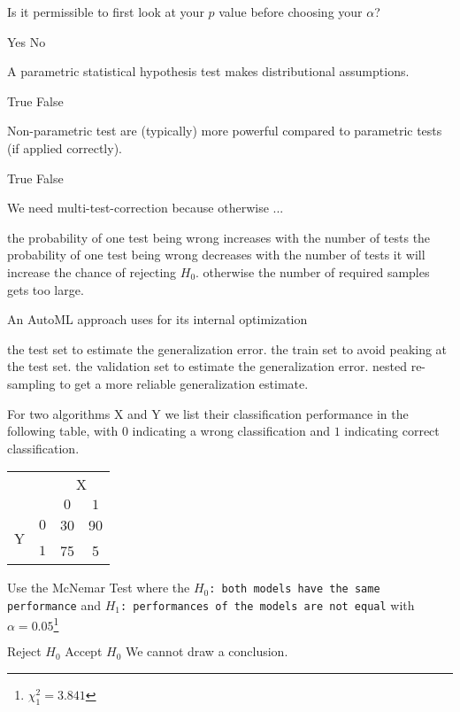 \documentclass{exam}
\begin{document}
\begin{questions}
\question Is it permissible to first look at your $p$ value before choosing your $\alpha$?
\begin{choices}
    \choice Yes
    \choice No %
\end{choices}

\question A parametric statistical hypothesis test makes distributional assumptions.
\begin{choices}
    \choice True  %
    \choice False
\end{choices}

\question Non-parametric test are (typically) more powerful compared to parametric tests (if applied correctly).
\begin{choices}
    \choice True
    \choice False %
\end{choices}

\question We need multi-test-correction because otherwise ...
\begin{choices}
    \choice the probability of one test being wrong increases with the number of tests %
    \choice the probability of one test being wrong decreases with the number of tests
    \choice it will increase the chance of rejecting $H_0$.
    \choice otherwise the number of required samples gets too large.
\end{choices}

\question An AutoML approach uses for its internal optimization
\begin{choices}
    \choice the test set to estimate the generalization error.
    \choice the train set to avoid peaking at the test set.
    \choice the validation set to estimate the generalization error. %
    \choice nested re-sampling to get a more reliable generalization estimate. %
\end{choices}

\question For two algorithms X and Y we list their classification performance in the following table, with $0$ indicating a wrong classification and $1$ indicating correct classification.
    \begin{center}
      \begin{tabular}{cc|cc}
          & & \multicolumn{2}{c}{X} \\
          & & $0$ & $1$ \\
          \hline
          \multirow{2}{*}{Y} & $0$ & 30 & 90 \\
          & $1$ & 75 & 5 \\
      \end{tabular}
    \end{center}
    Use the McNemar Test where the \texttt{$H_0$: both models have the same performance} and \texttt{$H_1$: performances of the models are not equal}  with $\alpha = 0.05$\footnote{$\chi^2_1 = 3.841$}
\begin{choices}
    \choice Reject $H_0$
    \choice Accept $H_0$
    \choice We cannot draw a conclusion. %
\end{choices}


\end{questions}
\end{document}

